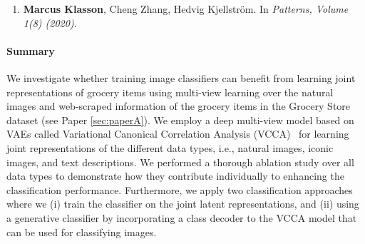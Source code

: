 \begin{enumerate}
	\item[] \textbf{Marcus Klasson}, Cheng Zhang, Hedvig Kjellström. In \textit{Patterns, Volume 1(8) (2020)}.
\end{enumerate}

\paragraph{Summary} 
We investigate whether training image classifiers can benefit from learning joint representations of grocery items using multi-view learning over the natural images and web-scraped information of the grocery items in the Grocery Store dataset (see Paper \ref{sec:paperA}). We employ a deep multi-view model based on VAEs called Variational Canonical Correlation Analysis (VCCA)~\cite{wang2016deep} for learning joint representations of the different data types, i.e., natural images, iconic images, and text descriptions. We performed a thorough ablation study over all data types to demonstrate how they contribute individually to enhancing the classification performance. Furthermore, we apply two classification approaches where we (i) train the classifier on the joint latent representations, and (ii) using a generative classifier by incorporating a class decoder to the VCCA model that can be used for classifying images. 


